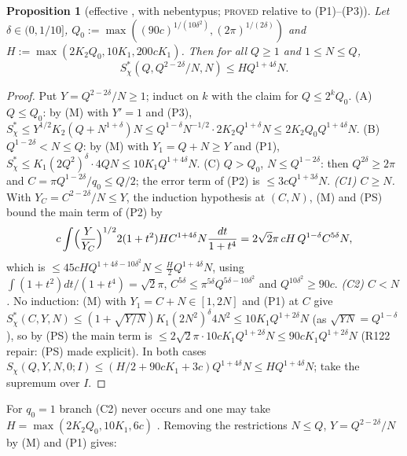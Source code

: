 \documentclass[10pt,reqno]{amsart}
\newtheorem{proposition}[theorem]{Proposition}
\theoremstyle{definition}
\numberwithin{equation}{section}
\newcommand{\status}[1]{\textup{\textsc{#1}}}
\begin{document}
\begin{proposition}[effective {\cite[(8.19)]{DI}}, with nebentypus; \status{proved} relative to (P1)--(P3)]\label{A:ind}
Let $\delta\in(0,1/10]$, $Q_0:=\max((90c)^{1/(10\delta^2)},(2\pi)^{1/(2\delta)})$ and
$H:=\max(2K_2Q_0,10K_1,200cK_1)$. Then for all $Q\ge1$ and $1\le N\le Q$,
\[
 S_\chi^*(Q,Q^{2-2\delta}/N,N)\le HQ^{1+4\delta}N .
\]
\end{proposition}
\begin{proof}
Put $Y=Q^{2-2\delta}/N\ge1$; induct on $k$ with the claim for $Q\le2^kQ_0$.
(A) $Q\le Q_0$: by (M) with $Y'=1$ and (P3),
$S^*_\chi\le Y^{1/2}K_2(Q+N^{1+\delta})N\le Q^{1-\delta}N^{-1/2}\cdot2K_2Q^{1+\delta}N\le2K_2Q_0Q^{1+4\delta}N$.
(B) $Q^{1-2\delta}<N\le Q$: by (M) with $Y_1=Q+N\ge Y$ and (P1),
$S^*_\chi\le K_1(2Q^2)^\delta\cdot4QN\le10K_1Q^{1+4\delta}N$.
(C) $Q>Q_0$, $N\le Q^{1-2\delta}$: then $Q^{2\delta}\ge2\pi$ and
$C=\pi Q^{1-2\delta}/q_0\le Q/2$; the error term of (P2) is $\le3cQ^{1+3\delta}N$.
\emph{(C1) $C\ge N$.} With $Y_C=C^{2-2\delta}/N\le Y$, the induction
hypothesis at $(C,N)$, (M) and (PS) bound the main term of (P2) by
\[
 c\int\Bigl(\frac{Y}{Y_C}\Bigr)^{1/2}2(1+t^2)HC^{1+4\delta}N\frac{dt}{1+t^4}
 =2\sqrt2\pi\,cH\,Q^{1-\delta}C^{5\delta}N,
\]
which is $\le45cHQ^{1+4\delta-10\delta^2}N\le\tfrac H2Q^{1+4\delta}N$,
using $\int(1+t^2)dt/(1+t^4)=\sqrt2\pi$, $C^{5\delta}\le\pi^{5\delta}Q^{5\delta-10\delta^2}$ and $Q^{10\delta^2}\ge90c$.
\emph{(C2) $C<N$.} No induction: (M) with $Y_1=C+N\in[1,2N]$ and (P1) at $C$ give
$S^*_\chi(C,Y,N)\le(1+\sqrt{Y/N})K_1(2N^2)^\delta4N^2\le10K_1Q^{1+2\delta}N$
(as $\sqrt{YN}=Q^{1-\delta}$), so by (PS) the main term is $\le2\sqrt2\pi\cdot10cK_1Q^{1+2\delta}N\le90cK_1Q^{1+2\delta}N$ (R122 repair: (PS) made explicit).
In both cases $S_\chi(Q,Y,N,0;I)\le(H/2+90cK_1+3c)Q^{1+4\delta}N\le HQ^{1+4\delta}N$;
take the supremum over $I$.
\end{proof}
For $q_0=1$ branch (C2) never occurs and one may take $H=\max(2K_2Q_0,10K_1,6c)$
\cite[Proposition~2.1]{TTL3}. Removing the restrictions $N\le Q$, $Y=Q^{2-2\delta}/N$
by (M) and (P1) gives:
\end{document}
